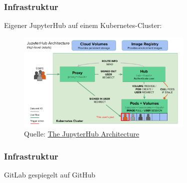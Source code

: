\documentclass[german,aspectratio=169]{beamer}
\begin{document}
\begin{frame}
	\frametitle{Infrastruktur}
	Eigener JupyterHub auf einem Kubernetes-Cluster:
	\begin{figure}
		\includegraphics[width=0.75\textwidth]{./figs/infrastructure}
		\caption{Quelle: \href{https://zero-to-jupyterhub.readthedocs.io/en/latest/administrator/architecture.html}{The JupyterHub Architecture}}
	\end{figure}
\end{frame}

\begin{frame}
	\frametitle{Infrastruktur}
	GitLab gespiegelt auf GitHub
\end{frame}
\end{document}
